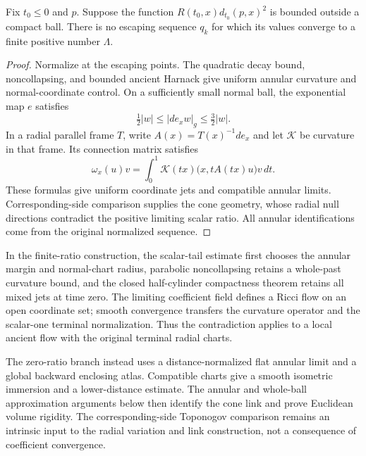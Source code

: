 \begin{lemma}
\label{lem:ancient-positive-ratio-obstruction}
Fix $t_0\leq0$ and $p$.  Suppose the function
$R(t_0,x)d_{t_0}(p,x)^2$ is bounded outside a compact ball.
There is no escaping sequence $q_k$ for which its values converge
to a finite positive number $\Lambda$.
\end{lemma}
\begin{proof}
Normalize at the escaping points. The quadratic decay bound, noncollapsing,
and bounded ancient Harnack give uniform annular curvature and
normal-coordinate control. On a sufficiently small normal ball, the
exponential map $e$ satisfies
\begin{equation}\label{eq:ancient-local-injectivity}
\tfrac12|w|\leq|de_xw|_g\leq\tfrac32|w|. \end{equation} In a radial parallel
frame $T$, write $A(x)=T(x)^{-1}de_x$ and let $\mathcal K$ be curvature in
that frame. Its connection matrix satisfies
\begin{equation}\label{eq:ancient-radial-connection}
\omega_x(u)v=\int_0^1\mathcal K(tx)\bigl(x,tA(tx)u\bigr)v\,dt. \end{equation}
These formulas give uniform coordinate jets and compatible annular limits.
Corresponding-side comparison supplies the cone geometry, whose radial null
directions contradict the positive limiting scalar ratio. All annular
identifications come from the original normalized sequence.
\end{proof}

In the finite-ratio construction, the scalar-tail estimate first
chooses the annular margin and normal-chart radius, parabolic noncollapsing
retains a whole-past curvature bound, and the closed half-cylinder compactness
theorem retains all mixed jets at time zero.  The
limiting coefficient field defines a Ricci flow on an open coordinate set;
smooth convergence transfers the curvature operator and the scalar-one
terminal normalization.  Thus the contradiction applies to a local ancient
flow with the original terminal radial charts.

The zero-ratio branch instead uses a distance-normalized flat annular
limit and a global backward enclosing atlas.  Compatible charts give
a smooth isometric immersion and a lower-distance estimate.  The
annular and whole-ball approximation arguments below then identify
the cone link and prove Euclidean volume rigidity.
The corresponding-side Toponogov comparison remains an intrinsic input to
the radial variation and link construction, not a consequence of coefficient
convergence.

